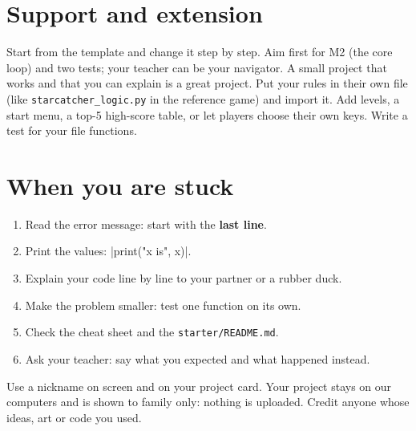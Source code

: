 \documentclass[level=2]{kidscode}
\begin{document}
\section{Support and extension}
\begin{differentiation}
\supportpath Start from the template and change it step by step. Aim first for M2 (the core
loop) and two tests; your teacher can be your navigator. A small project that works and that
you can explain is a great project.
\extensionpath Put your rules in their own file (like \texttt{starcatcher\_logic.py} in the
reference game) and import it. Add levels, a start menu, a top-5 high-score table, or let players
choose their own keys. Write a test for your file functions.
\end{differentiation}

\section{When you are stuck}
\begin{enumerate}[itemsep=2pt]
  \item Read the error message: start with the \textbf{last line}.
  \item Print the values: \py|print("x is", x)|.
  \item Explain your code line by line to your partner or a rubber duck.
  \item Make the problem smaller: test one function on its own.
  \item Check the cheat sheet and the \texttt{starter/README.md}.
  \item Ask your teacher: say what you expected and what happened instead.
\end{enumerate}

\begin{safety}
Use a nickname on screen and on your project card. Your project stays on our computers and is
shown to family only: nothing is uploaded. Credit anyone whose ideas, art or code you used.
\end{safety}
\end{document}
